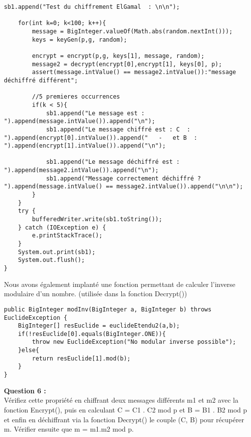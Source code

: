 \documentclass[a4paper,11pt]{article}
\begin{document}
\begin{lstlisting}[caption=Test chiffrement El-Gamal, captionpos=b,breaklines = true]
    sb1.append("Test du chiffrement ElGamal  : \n\n");

    for(int k=0; k<100; k++){
        message = BigInteger.valueOf(Math.abs(random.nextInt()));
        keys = keyGen(p,g, random);

        encrypt = encrypt(p,g, keys[1], message, random);
        message2 = decrypt(encrypt[0],encrypt[1], keys[0], p);
        assert(message.intValue() == message2.intValue()):"message déchiffré différent";

        //5 premieres occurrences
        if(k < 5){
            sb1.append("Le message est : ").append(message.intValue()).append("\n");
            sb1.append("Le message chiffré est : C  : ").append(encrypt[0].intValue()).append("   -   et B  : ").append(encrypt[1].intValue()).append("\n");

            sb1.append("Le message déchiffré est : ").append(message2.intValue()).append("\n");
            sb1.append("Message correctement déchiffré ?  ").append(message.intValue() == message2.intValue()).append("\n\n");
        }
    }
    try {
        bufferedWriter.write(sb1.toString());
    } catch (IOException e) {
        e.printStackTrace();
    }
    System.out.print(sb1);
    System.out.flush();
}
\end{lstlisting}Nous avons également implanté une fonction permettant de calculer l'inverse modulaire d'un nombre. (utilisée dans la fonction Decrypt()) \\\begin{lstlisting}[caption=Inverse modulaire, captionpos=b,breaklines = true]
public BigInteger modInv(BigInteger a, BigInteger b) throws EuclideException {
    BigInteger[] resEuclide = euclideEtendu2(a,b);
    if(!resEuclide[0].equals(BigInteger.ONE)){
        throw new EuclideException("No modular inverse possible");
    }else{
        return resEuclide[1].mod(b);
    }
}     
\end{lstlisting}
        \textbf{Question 6 : \\}Vérifiez cette propriété en chiffrant deux messages différents m1 et m2 avec la fonction Encrypt(), puis en calculant C = C1 . C2 mod p et B = B1 . B2 mod p et enfin en déchiffrant via la fonction Decrypt() le couple (C, B) pour récupérer m. Vérifier ensuite que m = m1.m2 mod p.
\end{document}
